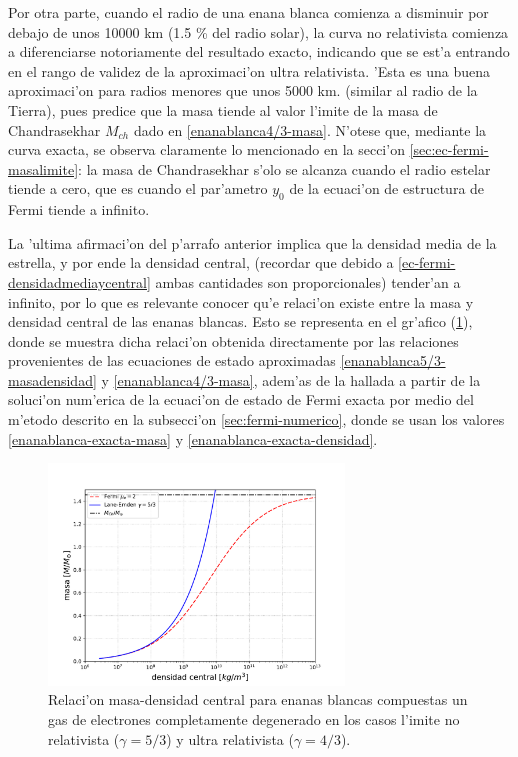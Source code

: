 Por otra parte, cuando el radio de una enana blanca comienza a disminuir por debajo de unos 10000 km (1.5 \% del radio solar), la curva no relativista comienza a diferenciarse notoriamente del resultado exacto, indicando que se est'a entrando en el rango de validez de la aproximaci'on ultra relativista. 'Esta es una buena aproximaci'on para radios menores que unos 5000 km. (similar al radio de la Tierra), pues predice que la masa tiende al valor l'imite de la masa de Chandrasekhar $M_{ch}$ dado en \eqref{enanablanca4/3-masa}. N'otese que, mediante la curva exacta, se observa claramente lo mencionado en la secci'on \ref{sec:ec-fermi-masalimite}: la masa de Chandrasekhar s'olo se alcanza cuando el radio estelar tiende a cero, que es cuando el par'ametro $y_0$ de la ecuaci'on de estructura de Fermi tiende a infinito.

La 'ultima afirmaci'on del p'arrafo anterior implica que la densidad media de la estrella, y por ende la densidad central, (recordar que debido a \eqref{ec-fermi-densidadmediaycentral} ambas cantidades son proporcionales) tender'an a infinito, por lo que es relevante conocer qu'e relaci'on existe entre la masa y densidad central de las enanas blancas. Esto se representa en el gr'afico (\ref{graficomasa-densidad}), donde se muestra dicha relaci'on obtenida directamente por las relaciones provenientes de las ecuaciones de estado aproximadas \eqref{enanablanca5/3-masadensidad} y \eqref{enanablanca4/3-masa}, adem'as de la hallada a partir de la soluci'on num'erica de la ecuaci'on de estado de Fermi exacta  por medio del m'etodo descrito en la subsecci'on \ref{sec:fermi-numerico}, donde se usan los valores \eqref{enanablanca-exacta-masa} y \eqref{enanablanca-exacta-densidad}.

\begin{figure}[H]
\centering
\includegraphics[angle=0,width=0.7\textwidth]{fig/fig-fermielectron-masa-densidad.pdf}
\caption{Relaci'on masa-densidad central para enanas blancas compuestas un gas de electrones completamente degenerado en los casos l'imite no relativista ($\gamma=5/3$) y ultra relativista ($\gamma=4/3$).}\label{graficomasa-densidad}
\end{figure}

